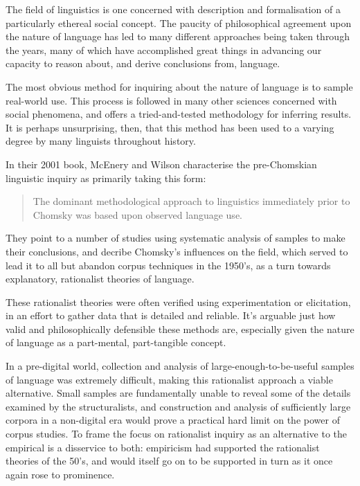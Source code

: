 

The field of linguistics is one concerned with description and formalisation of a particularly ethereal social concept.  The paucity of philosophical agreement upon the nature of language has led to many different approaches being taken through the years, many of which have accomplished great things in advancing our capacity to reason about, and derive conclusions from, language.


The most obvious method for inquiring about the nature of language is to sample real-world use.  This process is followed in many other sciences concerned with social phenomena, and offers a tried-and-tested methodology for inferring results.  It is perhaps unsurprising, then, that this method has been used to a varying degree by many linguists throughout history.

In their 2001 book\cite{macenery2001corpus}, McEnery and Wilson characterise the pre-Chomskian linguistic inquiry as primarily taking this form:

\begin{quote}
The dominant methodological approach to linguistics immediately prior to Chomsky was based upon observed language use.
\end{quote}

They point to a number of studies using systematic analysis of samples to make their conclusions\cite{kaeding1897haufigkeitsworterbuch,preyer1889mind,stern1924psychology,eaton1940semantic,west1953general}, and decribe Chomsky's influences on the field, which served to lead it to all but abandon corpus techniques in the 1950's, as a turn towards explanatory, rationalist theories of language.

These rationalist theories were often verified using experimentation or elicitation, in an effort to gather data that is detailed and reliable.  It's arguable just how valid and philosophically defensible these methods are, especially given the nature of language as a part-mental, part-tangible concept.



In a pre-digital world, collection and analysis of large-enough-to-be-useful samples of language was extremely difficult, making this rationalist approach a viable alternative.
Small samples are fundamentally unable to reveal some of the details examined by the structuralists, and construction and analysis of sufficiently large corpora in a non-digital era would prove a practical hard limit on the power of corpus studies.  To frame the focus on rationalist inquiry as an alternative to the empirical is a disservice to both: empiricism had supported the rationalist theories of the 50's, and would itself go on to be supported in turn as it once again rose to prominence.

